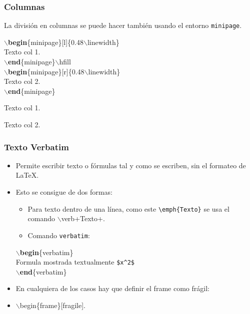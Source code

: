 \documentclass[aspectratio=43]{beamer}%
\begin{document}
\begin{frame}[fragile]
\frametitle{\textbf{Columnas}}
\justifying
 La división en columnas se puede hacer también usando el entorno \texttt{minipage}.
 
 \begin{minipage}[l]{0.48\linewidth}

$\backslash$\textbf{begin}\{minipage\}[l]\{0.48$\backslash$linewidth\}\\
Texto col 1.\\
$\backslash$\textbf{end}\{minipage\}$\backslash$hfill\\
$\backslash$\textbf{begin}\{minipage\}[r]\{0.48$\backslash$linewidth\}\\
Texto col 2.\\
$\backslash$\textbf{end}\{minipage\}

\end{minipage}\hfill
\begin{minipage}[r]{0.48\linewidth}
 \begin{minipage}[l]{0.48\linewidth}
Texto col 1.
\end{minipage}\hfill
\begin{minipage}[r]{0.48\linewidth}
Texto col 2.
\end{minipage}
\end{minipage}

 
\end{frame}

\begin{frame}[fragile]
\frametitle{\textbf{Texto Verbatim}}
\justifying
 \begin{itemize}\justifying
  \item Permite escribir texto o fórmulas tal y como se escriben, sin el formateo de \LaTeX{}.
  \item Esto se consigue de dos formas:
  \begin{itemize}\justifying
  \item Para texto dentro de una línea, como este \verb+\emph{Texto}+ se usa el comando $\backslash$verb+Texto+.
  \item Comando \texttt{verbatim}:
\end{itemize}
\begin{block}{}
$\backslash$\textbf{begin}\{verbatim\}\\
Formula mostrada textualmente \verb+$x^2$+\\
$\backslash$\textbf{end}\{verbatim\}
\end{block}

\item En cualquiera de los casos hay que definir el frame como frágil:
\item []$\backslash$begin\{frame\}[fragile].
\end{itemize}

\end{frame}
\end{document}
